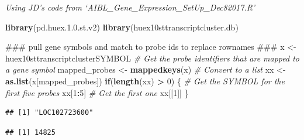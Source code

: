 \documentclass[]{article}
\newenvironment{Shaded}{\begin{snugshade}}{\end{snugshade}}
\newcommand{\KeywordTok}[1]{\textcolor[rgb]{0.13,0.29,0.53}{\textbf{#1}}}
\newcommand{\DecValTok}[1]{\textcolor[rgb]{0.00,0.00,0.81}{#1}}
\newcommand{\FloatTok}[1]{\textcolor[rgb]{0.00,0.00,0.81}{#1}}
\newcommand{\StringTok}[1]{\textcolor[rgb]{0.31,0.60,0.02}{#1}}
\newcommand{\CommentTok}[1]{\textcolor[rgb]{0.56,0.35,0.01}{\textit{#1}}}
\newcommand{\ControlFlowTok}[1]{\textcolor[rgb]{0.13,0.29,0.53}{\textbf{#1}}}
\newcommand{\OperatorTok}[1]{\textcolor[rgb]{0.81,0.36,0.00}{\textbf{#1}}}
\newcommand{\AlertTok}[1]{\textcolor[rgb]{0.94,0.16,0.16}{#1}}
\newcommand{\NormalTok}[1]{#1}
\begin{document}
\emph{Using JD's code from `AIBL\_Gene\_Expression\_SetUp\_Dec82017.R'}

\begin{Shaded}
\begin{Highlighting}[]
\KeywordTok{library}\NormalTok{(pd.huex.}\FloatTok{1.0}\NormalTok{.st.v2)}
\KeywordTok{library}\NormalTok{(huex10sttranscriptcluster.db)}
  
\NormalTok{### pull gene symbols and match to probe ids to replace rownames }\AlertTok{###}
\NormalTok{x <-}\StringTok{ }\NormalTok{huex10sttranscriptclusterSYMBOL}
\CommentTok{# Get the probe identifiers that are mapped to a gene symbol}
\NormalTok{mapped_probes <-}\StringTok{ }\KeywordTok{mappedkeys}\NormalTok{(x)}
\CommentTok{# Convert to a list}
\NormalTok{xx <-}\StringTok{ }\KeywordTok{as.list}\NormalTok{(x[mapped_probes])}
\ControlFlowTok{if}\NormalTok{(}\KeywordTok{length}\NormalTok{(xx) }\OperatorTok{>}\StringTok{ }\DecValTok{0}\NormalTok{) \{}
\CommentTok{# Get the SYMBOL for the first five probes}
\NormalTok{xx[}\DecValTok{1}\OperatorTok{:}\DecValTok{5}\NormalTok{]}
\CommentTok{# Get the first one}
\NormalTok{xx[[}\DecValTok{1}\NormalTok{]]}
\NormalTok{\}}
\end{Highlighting}
\end{Shaded}

\begin{verbatim}
## [1] "LOC102723600"
\end{verbatim}

\begin{Shaded}
\end{Shaded}

\begin{verbatim}
## [1] 14825
\end{verbatim}
\end{document}
